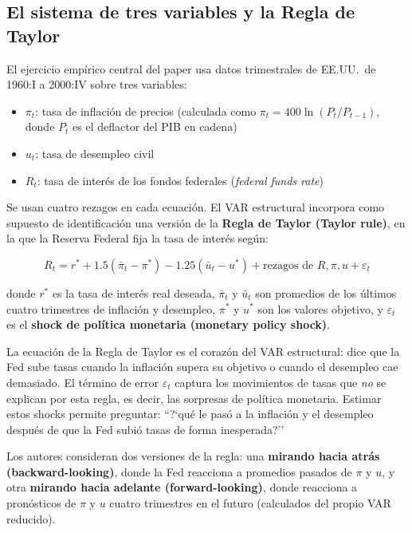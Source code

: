 \documentclass[12pt]{article}
\begin{document}
\subsection{El sistema de tres variables y la Regla de Taylor}

El ejercicio emp\'irico central del paper usa datos trimestrales de EE.UU.\ de 1960:I a 2000:IV sobre tres variables:
\begin{itemize}
  \item $\pi_t$: tasa de inflaci\'on de precios (calculada como $\pi_t = 400\ln(P_t/P_{t-1})$, donde $P_t$ es el deflactor del PIB en cadena)
  \item $u_t$: tasa de desempleo civil
  \item $R_t$: tasa de inter\'es de los fondos federales (\textit{federal funds rate})
\end{itemize}

Se usan cuatro rezagos en cada ecuaci\'on. El VAR estructural incorpora como supuesto de identificaci\'on una versi\'on de la \textbf{Regla de Taylor (Taylor rule)}, en la que la Reserva Federal fija la tasa de inter\'es seg\'un:

\begin{equation}
R_t = r^* + 1.5(\bar{\pi}_t - \pi^*) - 1.25(\bar{u}_t - u^*) + \text{rezagos de } R, \pi, u + \varepsilon_t
\end{equation}

donde $r^*$ es la tasa de inter\'es real deseada, $\bar{\pi}_t$ y $\bar{u}_t$ son promedios de los \'ultimos cuatro trimestres de inflaci\'on y desempleo, $\pi^*$ y $u^*$ son los valores objetivo, y $\varepsilon_t$ es el \textbf{shock de pol\'itica monetaria (monetary policy shock)}.

\begin{intuicion}
La ecuaci\'on de la Regla de Taylor es el coraz\'on del VAR estructural: dice que la Fed sube tasas cuando la inflaci\'on supera su objetivo o cuando el desempleo cae demasiado. El t\'ermino de error $\varepsilon_t$ captura los movimientos de tasas que \textit{no} se explican por esta regla, es decir, las sorpresas de pol\'itica monetaria. Estimar estos shocks permite preguntar: ``?`qu\'e le pas\'o a la inflaci\'on y el desempleo despu\'es de que la Fed subi\'o tasas de forma inesperada?''
\end{intuicion}

Los autores consideran dos versiones de la regla: una \textbf{mirando hacia atr\'as (backward-looking)}, donde la Fed reacciona a promedios pasados de $\pi$ y $u$, y otra \textbf{mirando hacia adelante (forward-looking)}, donde reacciona a pron\'osticos de $\pi$ y $u$ cuatro trimestres en el futuro (calculados del propio VAR reducido).
\end{document}
